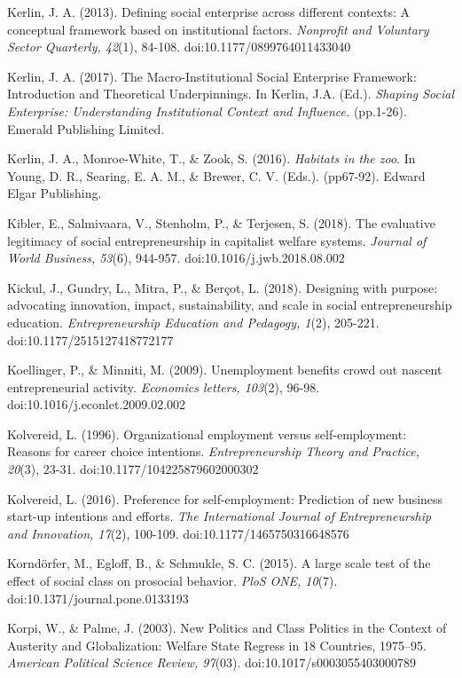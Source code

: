 \documentclass{article}
\begin{document}
Kerlin, J. A. (2013). Defining social enterprise across different contexts: A conceptual framework based on institutional factors. \emph{Nonprofit}\emph{ and Voluntary Sector Quarterly, 42}(1), 84-108. doi:10.1177/0899764011433040

Kerlin, J. A. (2017). The Macro-Institutional Social Enterprise Framework: Introduction and Theoretical Underpinnings. In Kerlin, J.A. (Ed.). \emph{Shaping Social }\emph{Enterprise: Understanding Institutional Context and Influence. }(pp.1-26). Emerald Publishing Limited.

Kerlin, J. A., Monroe-White, T., \& Zook, S. (2016). \emph{Habitats in the zoo}. In Young, D. R., Searing, E. A. M., \& Brewer, C. V. (Eds.). (pp67-92). Edward Elgar Publishing.

Kibler, E., Salmivaara, V., Stenholm, P., \& Terjesen, S. (2018). The evaluative legitimacy of social entrepreneurship in capitalist welfare systems. \emph{Journal of World Business, 53}(6), 944-957. doi:10.1016/j.jwb.2018.08.002

Kickul, J., Gundry, L., Mitra, P., \& Berçot, L. (2018). Designing with purpose: advocating innovation, impact, sustainability, and scale in social entrepreneurship education. \emph{Entrepreneurship Education and Pedagogy, 1}(2), 205-221. doi:10.1177/2515127418772177

Koellinger, P., \& Minniti, M. (2009). Unemployment benefits crowd out nascent entrepreneurial activity. \emph{Economics letters, 103}(2), 96-98. doi:10.1016/j.econlet.2009.02.002

Kolvereid, L. (1996). Organizational employment versus self-employment: Reasons for career choice intentions. \emph{Entrepreneurship Theory and Practice, 20}(3), 23-31. doi:10.1177/104225879602000302

Kolvereid, L. (2016). Preference for self-employment: Prediction of new business start-up intentions and efforts. \emph{The International Journal of Entrepreneurship and Innovation, 17}(2), 100-109. doi:10.1177/1465750316648576

Korndörfer, M., Egloff, B., \& Schmukle, S. C. (2015). A large scale test of the effect of social class on prosocial behavior. \emph{PloS}\emph{ ONE, 10}(7). doi:10.1371/journal.pone.0133193

Korpi, W., \& Palme, J. (2003). New Politics and Class Politics in the Context of Austerity and Globalization: Welfare State Regress in 18 Countries, 1975--95. \emph{American Political Science Review, 97}(03). doi:10.1017/s0003055403000789
\end{document}
